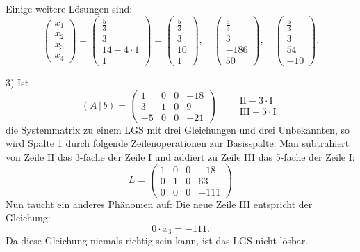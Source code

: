 Einige weitere Lösungen sind:
\[ \begin{pmatrix} x_1 \\ x_2 \\ x_3 \\ x_4 \end{pmatrix} = \begin{pmatrix} \frac{5}{3} \\ 3 \\ 14 - 4 \cdot 1 \\ 1 \end{pmatrix} = \begin{pmatrix} \frac{5}{3} \\ 3 \\ 10 \\ 1 \end{pmatrix}, \quad \begin{pmatrix} \frac{5}{3} \\ 3 \\ -186 \\ 50 \end{pmatrix}, \quad \begin{pmatrix} \frac{5}{3} \\ 3 \\ 54 \\ -10 \end{pmatrix} . \]

3) Ist
\[ (A\,|\,b) = \left(\begin{array}{ccc|c} 1 & 0 & 0 & -18\\ 3 & 1 & 0 & 9\\ -5 & 0 & 0 & -21 \end{array}\right) \qquad \begin{array}{l} \text{II}-3\cdot\text{I}\\ \text{III}+5\cdot\text{I} \end{array} \]
die Systemmatrix zu einem LGS mit drei Gleichungen und drei Unbekannten, so wird Spalte 1 durch folgende Zeilenoperationen zur Basisspalte: Man subtrahiert von Zeile II das 3-fache der Zeile I und addiert zu Zeile III das 5-fache der Zeile I:
\[ L = \left(\begin{array}{ccc|c} 1 & 0 & 0 & -18\\ 0 & 1 & 0 & 63\\ 0 & 0 & 0 & -111 \end{array}\right) \]
Nun taucht ein anderes Phänomen auf: Die neue Zeile III entspricht der Gleichung:
\[ 0 \cdot x_3 = -111 . \]
Da diese Gleichung niemals richtig sein kann, ist das LGS nicht lösbar.\beispielende

